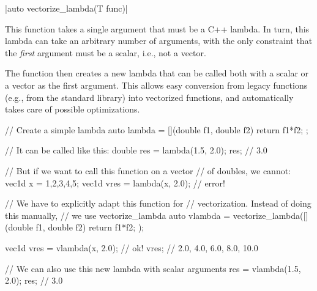 \funcitem \cppinline|auto vectorize_lambda(T func)| 

This function takes a single argument that must be a C++ lambda. In turn, this lambda can take an arbitrary number of arguments, with the only constraint that the \emph{first} argument must be a scalar, i.e., not a \phypp vector.

The function then creates a new lambda that can be called both with a scalar or a vector as the first argument. This allows easy conversion from legacy functions (e.g., from the standard library) into vectorized functions, and automatically takes care of possible optimizations.

\begin{example}
\begin{cppcode}
// Create a simple lambda
auto lambda = [](double f1, double f2) {
    return f1*f2;
};

// It can be called like this:
double res = lambda(1.5, 2.0);
res; // 3.0

// But if we want to call this function on a vector
// of doubles, we cannot:
vec1d x = {1,2,3,4,5};
vec1d vres = lambda(x, 2.0); // error!

// We have to explicitly adapt this function for
// vectorization. Instead of doing this manually,
// we use vectorize_lambda
auto vlambda = vectorize_lambda([](double f1, double f2) {
    return f1*f2;
});

vec1d vres = vlambda(x, 2.0); // ok!
vres; // {2.0, 4.0, 6.0, 8.0, 10.0}

// We can also use this new lambda with scalar arguments
res = vlambda(1.5, 2.0);
res; // 3.0
\end{cppcode}
\end{example}
